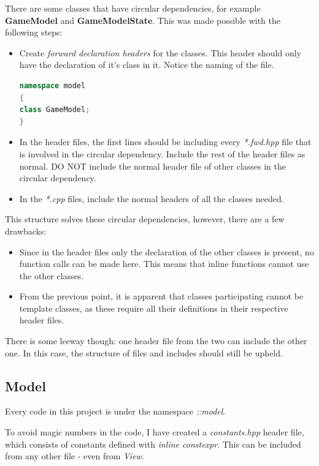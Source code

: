There are some classes that have circular dependencies, for example \textbf{GameModel} and \textbf{GameModelState}. This was made possible with the following steps:
\begin{itemize}
    \item Create \textit{forward declaration headers} for the classes. This header should only have the declaration of it's class in it. Notice the naming of the file.
    \begin{lstlisting}[language={C++}]
namespace model
{
class GameModel;
}
    \end{lstlisting}
    \item In the header files, the first lines should be including every \textit{*.fwd.hpp} file that is involved in the circular dependency. Include the rest of the header files as normal. DO NOT include the normal header file of other classes in the circular dependency.
    \item In the \textit{*.cpp} files, include the normal headers of all the classes needed.
\end{itemize}

This structure solves these circular dependencies, however, there are a few drawbacks:

\begin{itemize}
    \item Since in the header files only the declaration of the other classes is present, no function calls can be made here. This means that inline functions cannot use the other classes.
    \item From the previous point, it is apparent that classes participating cannot be template classes, as these require all their definitions in their respective header files.
\end{itemize}

There is some leeway though: one header file from the two can include the other one. In this case, the structure of files and includes should still be upheld.

\subsection{Model}

Every code in this project is under the namespace \textit{::model}.

To avoid magic numbers in the code, I have created a \textit{constants.hpp} header file, which consists of constants defined with \textit{inline constexpr}. This can be included from any other file - even from \textit{View}.

